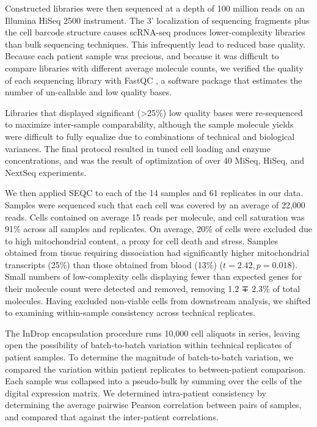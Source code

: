 Constructed libraries were then sequenced at a depth of 100 million reads on an Illumina HiSeq 2500 instrument.
The 3' localization of sequencing fragments plus the cell barcode structure causes scRNA-seq produces lower-complexity libraries than bulk sequencing techniques. 
This infrequently lead to reduced base quality. 
Because each patient sample was precious, and because it was difficult to compare libraries with different average molecule counts, we verified the quality of each sequencing library with FastQC \citep{Andrews2010}, a software package that estimates the number of un-callable and low quality bases.

Libraries that displayed significant (\textgreater{}25\%) low quality bases were re-sequenced to maximize inter-sample comparability, although the sample molecule yields were difficult to fully equalize due to combinations of technical and biological variances. 
The final protocol resulted in tuned cell loading and enzyme concentrations, and was the result of optimization of over 40 MiSeq, HiSeq, and NextSeq experiments.

We then applied SEQC to each of the 14 samples and 61 replicates in our data. 
Samples were sequenced such that each cell was covered by an average of 22,000 reads. %
Cells contained on average 15 reads per molecule, and cell saturation was 91\% across all samples and replicates. 
On average, 20\% of cells were excluded due to high mitochondrial content, a proxy for cell death and stress. 
Samples obtained from tissue requiring dissociation had significantly higher mitochondrial transcripts (25\%) than those obtained from blood (13\%) ($t=2.42, p=0.018$). 
Small numbers of low-complexity cells displaying fewer than expected genes for their molecule count were detected and removed, removing 1.2 ∓ 2.3\% of total molecules. 
Having excluded non-viable cells from downstream analysis, we shifted to examining within-sample consistency across technical replicates.

The InDrop encapsulation procedure runs 10,000 cell aliquots in series, leaving open the possibility of batch-to-batch variation within technical replicates of patient samples. 
To determine the magnitude of batch-to-batch variation, we compared the variation within patient replicates to between-patient comparison. 
Each sample was collapsed into a pseudo-bulk by summing over the cells of the digital expression matrix. 
We determined intra-patient consistency by determining the average pairwise Pearson correlation between pairs of samples, and compared that against the inter-patient correlations. 

